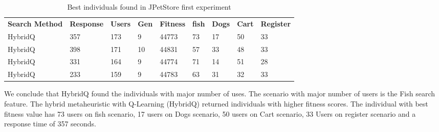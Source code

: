 \begin{table}[h!]
\centering
\caption{Best individuals found in JPetStore first experiment}
\label{tab:bestindividuals3}
\begin{tabular}{lllllllll}
\rowcolor[HTML]{C0C0C0} 
\textbf{Search Method} & \textbf{Response} & \textbf{Users} & \textbf{Gen} & \textbf{Fitness} & \textbf{fish} & \textbf{Dogs} & \textbf{Cart} & \textbf{Register} \\
HybridQ                & 357               & 173            & 9            & 44773            & 73             & 17            & 50            & 33                \\
HybridQ                & 398               & 171            & 10           & 44831            & 57             & 33            & 48            & 33                \\
HybridQ                & 331               & 164            & 9            & 44774            & 71             & 14            & 51            & 28                \\
HybridQ                & 233               & 159            & 9            & 44783            & 63             & 31            & 32            & 33               
\end{tabular}
\end{table}

We conclude that HybridQ found the individuals with major number of uses. The scenario with major number of users is the Fish search feature. The hybrid metaheuristic with Q-Learning (HybridQ) returned individuals with higher fitness scores.  The individual with best fitness value has 73 users on fish scenario, 17 users on Dogs scenario, 50 users on Cart scenario, 33 Users on register scenario  and a response time of 357 seconds. 

